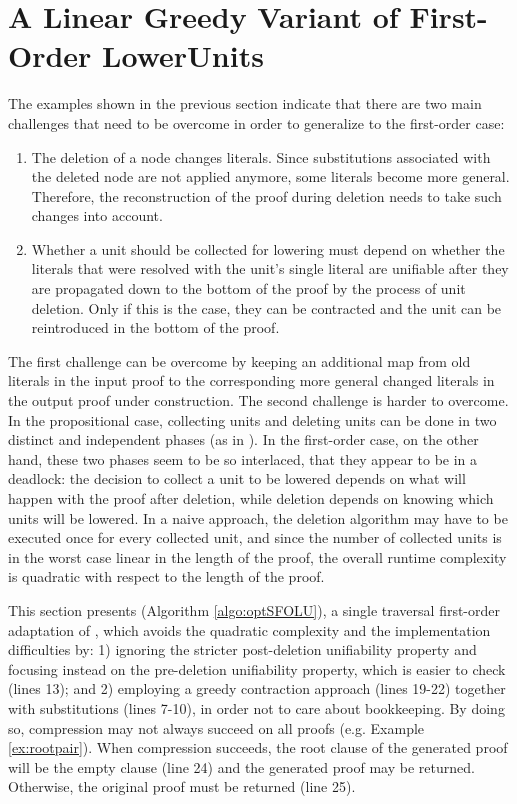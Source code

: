 \documentclass{llncs}
\begin{document}
\section{A Linear Greedy Variant of First-Order LowerUnits}

\label{sec:SimpleFOLU}

The examples shown in the previous section indicate that there are two main challenges that need to be overcome in order to generalize \LowerUnits to the first-order case:
\begin{enumerate}
\item The deletion of a node changes literals. Since substitutions associated with the deleted node are not applied anymore, some literals become more general. Therefore, the reconstruction of the proof during deletion needs to take such changes into account.
\item Whether a unit should be collected for lowering must depend on whether the literals that were resolved with the unit's single literal are unifiable after they are propagated down to the bottom of the proof by the process of unit deletion. Only if this is the case, they can be contracted and the unit can be reintroduced in the bottom of the proof.
\end{enumerate}

The first challenge can be overcome by keeping an additional map from old literals in the input proof to the corresponding more general changed literals in the output proof under construction. The second challenge is harder to overcome. In the propositional case, collecting units and deleting units can be done in two distinct and independent phases (as in {\LowerUnits}). In the first-order case, on the other hand, these two phases seem to be so interlaced, that they appear to be in a deadlock: the decision to collect a unit to be lowered depends on what will happen with the proof after deletion, while deletion depends on knowing which units will be lowered. In a naive approach, the deletion algorithm may have to be executed once for every collected unit, and since the number of collected units is in the worst case linear in the length of the proof, the overall runtime complexity is quadratic with respect to the length of the proof. 

This section presents {\SFOLowerUnits} (Algorithm \ref{algo:optSFOLU}), a single traversal first-order adaptation of {\LowerUnits}, which avoids the quadratic complexity and the implementation difficulties by: 1) ignoring the stricter post-deletion unifiability property and focusing instead on the pre-deletion unifiability property, which is easier to check (lines 13); and 2) employing a greedy contraction approach (lines 19-22) together with substitutions (lines 7-10), in order not to care about bookkeeping. By doing so, compression may not always succeed on all proofs (e.g. Example \ref{ex:rootpair}). When compression succeeds, the root clause of the generated proof will be the empty clause (line 24) and the generated proof may be returned. Otherwise, the original proof must be returned (line 25).
\end{document}
